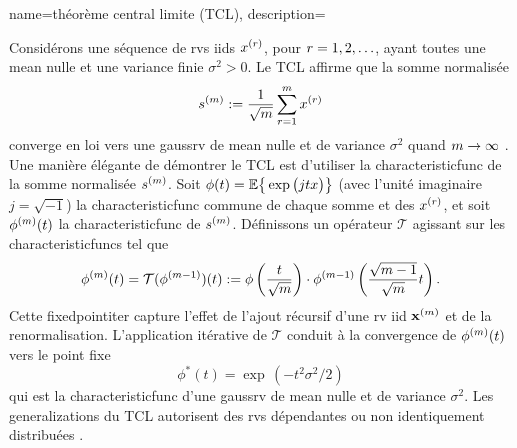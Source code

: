 {name={théorème central limite (TCL)},
	description={Considérons une séquence de \glspl{rv} \glspl{iid} \( x^{(r)} \), pour \( r = 1, 2, \ldots \), 
		ayant toutes une \gls{mean} nulle et une \gls{variance} finie \( \sigma^2 > 0 \). 
		Le  TCL affirme que la somme normalisée 
		\[
		s^{(m)} := \frac{1}{\sqrt{m}} \sum_{r = 1}^{m} x^{(r)} 
		\]
		converge en loi vers une \gls{gaussrv} de \gls{mean} nulle et de \gls{variance} \( \sigma^2 \) quand \( m \to \infty \) \cite[Proposition~2.17]{AsympVanderVaartBook}.
		Une manière élégante de démontrer le TCL est d’utiliser la \gls{characteristicfunc} de la somme normalisée \( s^{(m)} \). 
		Soit $ \phi(t) = \mathbb{E} \big\{ \exp \big( j t x \big) \big\}$ (avec l’unité imaginaire $j = \sqrt{-1}$) 
		la \gls{characteristicfunc} commune de chaque somme et des \( x^{(r)} \), et soit \( \phi^{(m)}(t) \) 
		la \gls{characteristicfunc} de \( s^{(m)} \). Définissons un opérateur \( \mathcal{T} \) agissant sur les \glspl{characteristicfunc} tel que
		\[
		\phi^{(m)}(t) = \mathcal{T}(\phi^{(m-1)})(t) := \phi\left( \frac{t}{\sqrt{m}} \right) \cdot \phi^{(m-1)}\left( \frac{\sqrt{m-1}}{\sqrt{m}} t \right).
		\]
		Cette \gls{fixedpointiter} capture l’effet de l’ajout récursif d’une \gls{rv} \gls{iid} ${\bf x}^{(m)}$ 
		et de la renormalisation. L’application itérative de \( \mathcal{T} \) conduit à la convergence de \( \phi^{(m)}(t) \) vers le point fixe
		\[
		\phi^*(t) = \exp\,(-t^2 \sigma^2 / 2)
		\]
		qui est la \gls{characteristicfunc} d’une \gls{gaussrv} de \gls{mean} nulle et de \gls{variance} 
		\( \sigma^2 \). Les \glspl{generalization} du TCL autorisent des \glspl{rv} dépendantes ou non identiquement distribuées \cite[Sec.~2.8]{AsympVanderVaartBook}.
		\begin{figure}[H]
			\centering
\end{figure}}}
